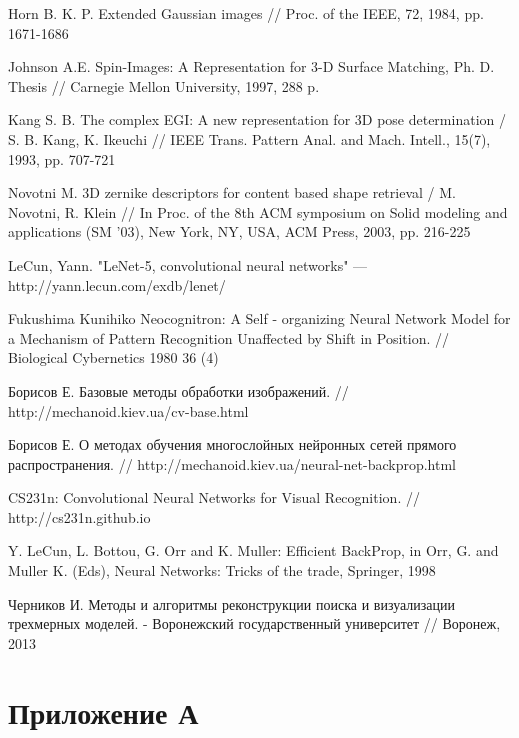 \documentclass[14pt]{article}
\numberwithin{figure}{section}
\numberwithin{equation}{section}
\begin{document}
\newpage
{}
\begin{thebibliography}{9}

	Horn B. K. P. Extended Gaussian images // Proc. of the IEEE, 72, 1984, pp. 1671-1686

	Johnson A.E. Spin-Images: A Representation for 3-D Surface Matching, Ph. D. Thesis // Carnegie Mellon University, 1997, 288 p.

	Kang S. B. The complex EGI: A new representation for 3D pose determination / S. B. Kang, K. Ikeuchi // IEEE Trans. Pattern Anal. and Mach. Intell., 15(7), 1993, pp. 707-721

	Novotni M. 3D zernike descriptors for content based shape retrieval / M. Novotni, R. Klein // In Proc. of the 8th ACM symposium on Solid modeling and applications (SM ’03), New York, NY, USA, ACM Press, 2003, pp. 216-225

	LeCun, Yann. "LeNet-5, convolutional neural networks" –-- http://yann.lecun.com/exdb/lenet/

	Fukushima Kunihiko Neocognitron: A Self - organizing Neural Network Model for a Mechanism of Pattern Recognition Unaffected by Shift in Position. // Biological Cybernetics 1980 36 (4)

	Борисов Е. Базовые методы обработки изображений. // http://mechanoid.kiev.ua/cv-base.html

	Борисов Е. О методах обучения многослойных нейронных сетей прямого распространения. // http://mechanoid.kiev.ua/neural-net-backprop.html

	CS231n: Convolutional Neural Networks for Visual Recognition. // http://cs231n.github.io

	Y. LeCun, L. Bottou, G. Orr and K. Muller: Efficient BackProp, in Orr, G. and Muller K. (Eds), Neural Networks: Tricks of the trade, Springer, 1998

	Черников И. Методы и алгоритмы реконструкции поиска и визуализации трехмерных моделей. - Воронежский государственный университет // Воронеж, 2013

\end{thebibliography}

\newpage
{}
\label{attachA}\section*{Приложение А}
\end{document}
